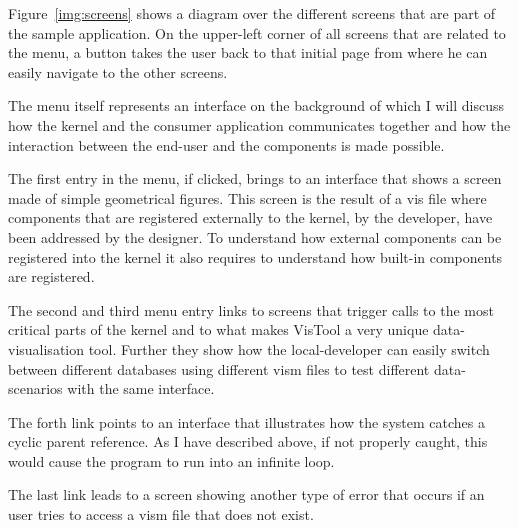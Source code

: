 Figure~\ref{img:screens} shows a diagram over the different screens that are part of the sample application. On the upper-left corner of all screens that are related to the menu, a button takes the user back to that initial page from where he can easily navigate to the other screens.

The menu itself represents an interface on the background of which I will discuss how the kernel and the consumer application communicates together and how the interaction between the end-user and the components is made possible.

The first entry in the menu, if clicked, brings to an interface that shows a screen made of simple geometrical figures. This screen is the result of a vis file where components that are registered externally to the kernel, by the developer, have been addressed by the designer. To understand how external components can be registered into the kernel it also requires to understand how built-in components are registered.

The second and third menu entry links to screens that trigger calls to the most critical parts of the kernel and to what makes VisTool a very unique data-visualisation tool. Further they show how the local-developer can easily switch between different databases using different vism files to test different data-scenarios with the same interface.

The forth link points to an interface that illustrates how the system catches a cyclic parent reference. As I have described above, if not properly caught, this would cause the program to run into an infinite loop.

The last link leads to a screen showing another type of error that occurs if an user tries to access a vism file that does not exist.